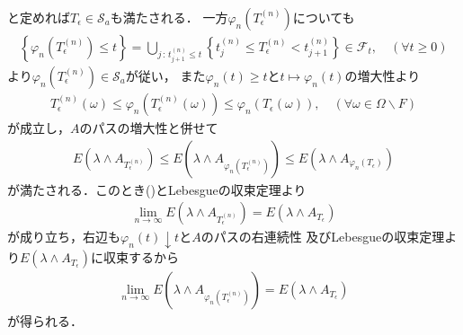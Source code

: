 \begin{prf}
\begin{description}
				と定めれば$T_\epsilon \in \mathscr{S}_a$も満たされる．
				一方$\varphi_n\left(T^{(n)}_\epsilon\right)$についても
				\begin{align}
					\left\{\varphi_n\left(T^{(n)}_\epsilon\right) \leq t\right\}
					= \bigcup_{j\, :\, t^{(n)}_{j+1} \leq t} \left\{t^{(n)}_j \leq T^{(n)}_\epsilon < t^{(n)}_{j+1}\right\}
					\in \mathscr{F}_t,
					\quad (\forall t \geq 0)
				\end{align}
				より$\varphi_n\left(T^{(n)}_\epsilon\right) \in \mathscr{S}_a$が従い，
				また$\varphi_n(t) \geq t$と$t \longmapsto \varphi_n(t)$の増大性より
				\begin{align}
					T^{(n)}_\epsilon(\omega)
					\leq \varphi_n\left(T^{(n)}_\epsilon(\omega)\right)
					\leq \varphi_n\left(T_\epsilon(\omega)\right),
					\quad (\forall \omega \in \Omega \backslash F)
				\end{align}
				が成立し，$A$のパスの増大性と併せて
				\begin{align}
					E \left( \lambda \wedge A_{T^{(n)}_\epsilon} \right)
					\leq E \left( \lambda \wedge A_{\varphi_n\left(T^{(n)}_\epsilon\right)} \right)
					\leq E \left( \lambda \wedge A_{\varphi_n\left(T_\epsilon\right)} \right)
				\end{align}
				が満たされる．このとき()とLebesgueの収束定理より
				\begin{align}
					\lim_{n \to \infty} E \left( \lambda \wedge A_{T^{(n)}_\epsilon} \right)
					= E \left( \lambda \wedge A_{T_\epsilon} \right)
				\end{align}
				が成り立ち，右辺も$\varphi_n(t) \downarrow t$と$A$のパスの右連続性
				及びLebesgueの収束定理より$E \left( \lambda \wedge A_{T_\epsilon} \right)$に収束するから
				\begin{align}
					\lim_{n \to \infty} E \left( \lambda \wedge A_{\varphi_n\left(T^{(n)}_\epsilon\right)} \right) 
					= E \left( \lambda \wedge A_{T_\epsilon} \right)
				\end{align}
				が得られる．
			

\end{description}
\end{prf}
